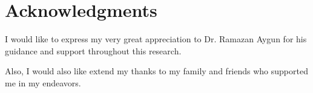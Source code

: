 \chapter*{Acknowledgments}

I would like to express my very great appreciation to Dr. Ramazan Aygun for his guidance and support throughout this research.

Also, I would also like extend my thanks to my family and friends who supported me in my endeavors.